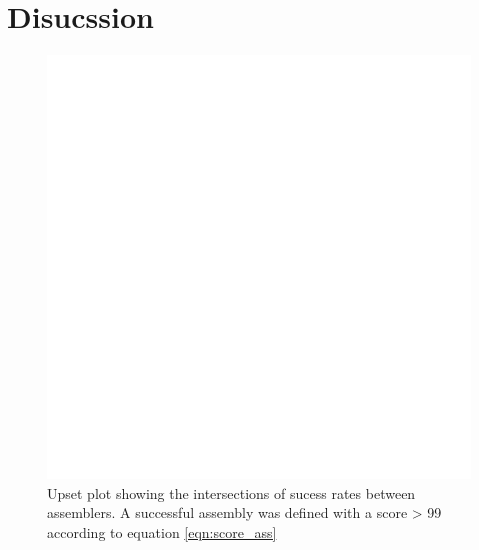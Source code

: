 \section{Disucssion}

\begin{figure}[H]
\centering
\includegraphics[height=.45\textheight, width=.95\textwidth]{Figures/upset}
\decoRule
\caption[Upset plot comparing the success rates of of all assemblers]{Upset plot showing the intersections of sucess rates between assemblers. A successful assembly was defined with a score > 99 according to equation \ref{eqn:score_ass}}
\label{fig:upset}
\end{figure}


